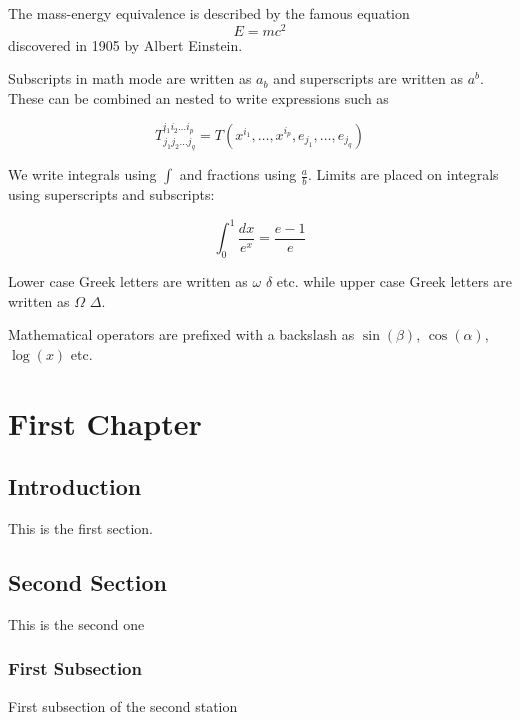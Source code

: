 \documentclass[12pt, a4paper]{report}  %
\begin{document}
The mass-energy equivalence is described by the famous equation
\[ E=mc^2 \]
discovered in 1905 by Albert Einstein.   %

Subscripts in math mode are written as $a_b$ and superscripts are written as $a^b$. These can be combined an nested to write expressions such as

\[ T^{i_1 i_2 \dots i_p}_{j_1 j_2 \dots j_q} = T(x^{i_1},\dots,x^{i_p},e_{j_1},\dots,e_{j_q}) \]
 
We write integrals using $\int$ and fractions using $\frac{a}{b}$. Limits are placed on integrals using superscripts and subscripts:

\[ \int_0^1 \frac{dx}{e^x} =  \frac{e-1}{e} \]

Lower case Greek letters are written as $\omega$ $\delta$ etc. while upper case Greek letters are written as $\Omega$ $\Delta$.

Mathematical operators are prefixed with a backslash as $\sin(\beta)$, $\cos(\alpha)$, $\log(x)$ etc.


\chapter{First Chapter}

\section{Introduction}  %
This is the first section.


\section{Second Section}

This is the second one

\subsection{First Subsection}
First subsection of the second station
\end{document}
